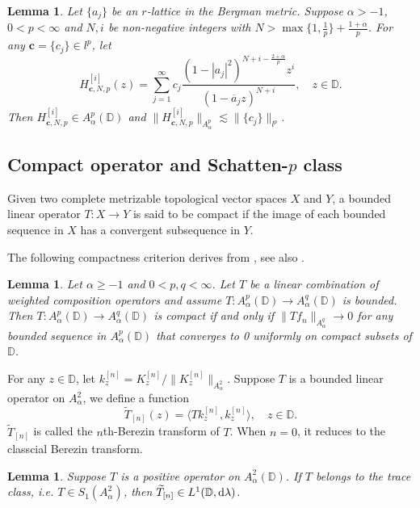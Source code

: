 \documentclass[preprint,12pt,times]{elsarticle}
\newtheorem{lemma}[theorem]{Lemma}
\theoremstyle{definition}
\theoremstyle{remark}
\numberwithin{equation}{section}
\begin{document}
\begin{lemma}\label{lemma2.3}
Let $\{a_j\}$ be an $r$-lattice in the Bergman metric. Suppose $\alpha>-1$, $0<p<\infty$ and $N,i$ be non-negative integers with $N>\max\{1,\frac{1}{p}\}+\frac{1+\alpha}{p}$. For any $\mathbf{c}=\{c_j\}\in l^p$, let
\begin{equation*}
H_{\mathbf{c}, N,p}^{[i]}(z)=\sum_{j=1}^{\infty}c_j\frac{(1-|a_j|^2)^{N+i-\frac{2+\alpha}{p}}z^i}{(1-\overline{a}_jz)^{N+i}},\quad z\in\mathbb{D}.
\end{equation*}
Then $H_{\mathbf{c},N,p}^{[i]}\in A_{\alpha}^p(\mathbb{D})$ and $\|H_{\mathbf{c}, N,p}^{[i]}\|_{A_{\alpha}^p}\lesssim \|\{c_j\}\|_{l^p}$.
\end{lemma}

\subsection{Compact operator and Schatten-$p$ class}

Given two complete metrizable topological vector spaces $X$ and $Y$, a bounded linear operator $T: X\to Y$ is said to be compact if the image of each bounded sequence in $X$ has a convergent subsequence in $Y$.

The following compactness criterion derives from \cite[Lemma 2.1]{5}, see also \cite[Proposition 3.11]{9}.

\begin{lemma}\label{lemma2.4}
Let $\alpha\geq -1$ and $0<p,q<\infty$. Let $T$ be a linear combination of weighted composition operators and assume $T: A_{\alpha}^p(\mathbb{D})\to A_{\alpha}^q(\mathbb{D})$ is bounded. Then $T: A_{\alpha}^p(\mathbb{D})\to A_{\alpha}^q(\mathbb{D})$ is compact if and only if $\|Tf_n\|_{A_{\alpha}^q}\to 0$ for any bounded sequence in $A_{\alpha}^p(\mathbb{D})$ that converges to 0 uniformly on compact subsets of $\mathbb{D}$.
\end{lemma}

For any $z\in\mathbb{D}$, let $k_z^{[n]}=K_z^{[n]}/\|K_z^{[n]}\|_{A_{\alpha}^2}$. Suppose $T$ is a bounded linear operator on $A_{\alpha}^2$, we define a function 
\begin{equation*}
\widetilde{T}_{[n]}(z)=\langle Tk_z^{[n]}, k_z^{[n]}\rangle,\quad z\in\mathbb{D}.
\end{equation*}
$\widetilde{T}_{[n]}$ is called the $n$th-Berezin transform of $T$. When $n=0$, it reduces to the classcial Berezin transform.

\begin{lemma}\label{lemma2.5}
Suppose $T$ is a positive operator on $A_{\alpha}^2(\mathbb{D})$. If $T$ belongs to the trace class, i.e. $T\in S_1(A_{\alpha}^2)$, then $\widetilde{T}_{[n]}\in L^1(\mathbb{D},{\rm d}\lambda)$.
\end{lemma}
\end{document}
